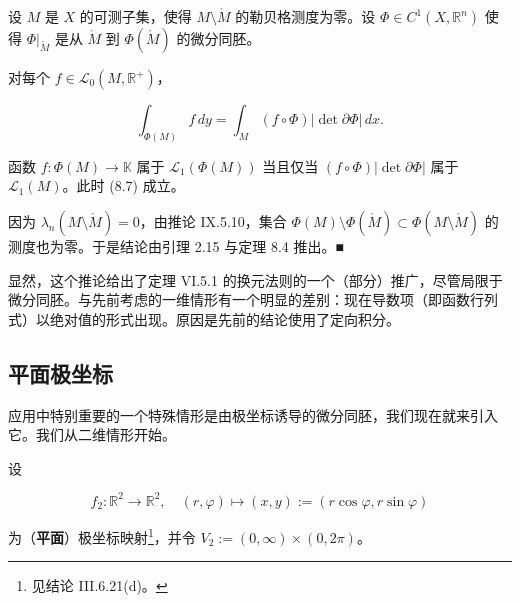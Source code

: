 \begin{corollary}

设 $ M $ 是 $ X $ 的可测子集，使得 $ M \setminus \mathring{M} $ 的勒贝格测度为零。设 $ \Phi \in C^{1}(X, \mathbb{R}^{n}) $ 使得 $ \Phi|_{\mathring{M}} $ 是从 $ \mathring{M} $ 到 $ \Phi(\mathring{M}) $ 的微分同胚。

\begin{subitems}
\item

对每个 $ f \in \mathcal{L}_{0}(M, \mathbb{R}^{+}) $，

\begin{equation}
\int_{\Phi(M)} f \, dy = \int_{M} (f \circ \Phi)|\det \partial\Phi| \, dx .\tag{8.7}
\end{equation}
\item

函数 $ f : \Phi(M) \to \mathbb{K} $ 属于 $ \mathcal{L}_{1}(\Phi(M)) $ 当且仅当 $ (f \circ \Phi)|\det \partial\Phi| $ 属于 $ \mathcal{L}_{1}(M) $。此时 (8.7) 成立。

\proofhead
因为 $ \lambda_{n}(M \setminus \mathring{M}) = 0 $，由推论 IX.5.10，集合 $ \Phi(M) \setminus \Phi(\mathring{M}) \subset \Phi(M \setminus \mathring{M}) $ 的测度也为零。于是结论由引理 2.15 与定理 8.4 推出。\nobreak\hspace{0.35em}■
\end{subitems}

\end{corollary}

显然，这个推论给出了定理 VI.5.1 的换元法则的一个（部分）推广，尽管局限于微分同胚。与先前考虑的一维情形有一个明显的差别：现在导数项（即函数行列式）以绝对值的形式出现。原因是先前的结论使用了定向积分。

\subsection*{平面极坐标}

应用中特别重要的一个特殊情形是由极坐标诱导的微分同胚，我们现在就来引入它。我们从二维情形开始。

设

\[
f_{2} : \mathbb{R}^{2} \to \mathbb{R}^{2} , \quad (r, \varphi) \mapsto (x, y) := (r \cos\varphi, r \sin\varphi)
\]

为（\textbf{平面}）极坐标映射\footnote{见结论 III.6.21(d)。}，并令 $ V_{2} := (0, \infty) \times (0, 2\pi) $。


